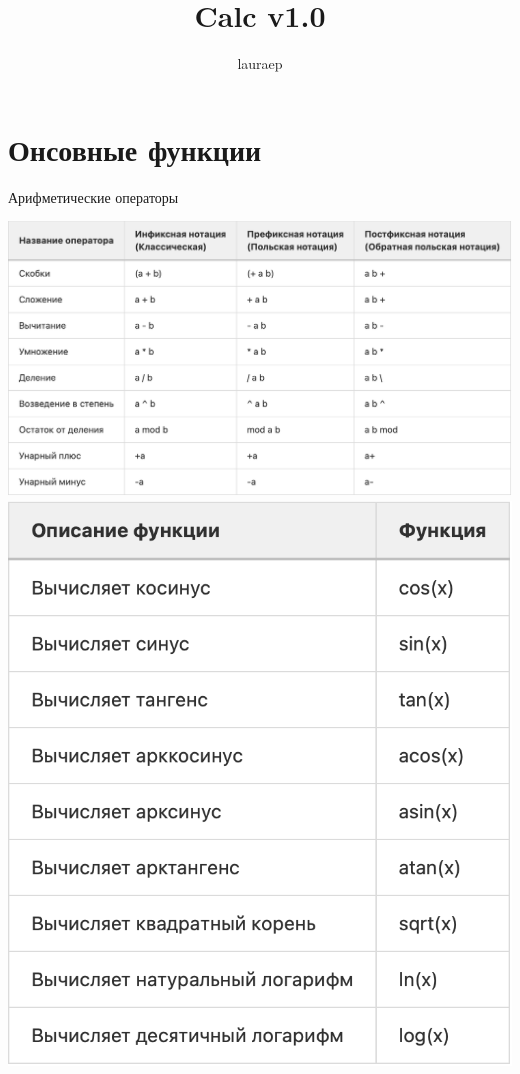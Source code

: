 \documentclass[a4paper,12pt]{article}
\author{lauraep}
\title{Calc v1.0}
\begin{document}
	\maketitle

	\section{Онсовные функции}
		Арифметические операторы
		
\includegraphics[scale = 0.3]{phunc}
\includegraphics[scale = 0.3]{trig}
	
\end{document}
